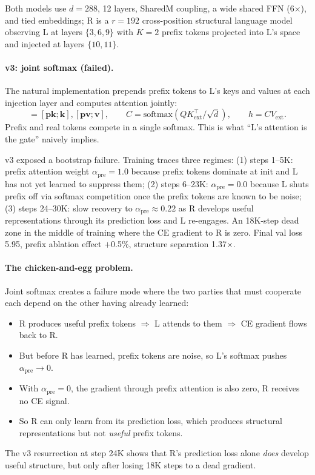 \documentclass[11pt, a4paper]{article}
\theoremstyle{plain}
\theoremstyle{definition}
\theoremstyle{remark}
\begin{document}
Both models use $d{=}288$, 12 layers, SharedM coupling, a wide shared FFN (6$\times$), and tied embeddings; R is a $r{=}192$ cross-position structural language model observing L at layers $\{3,6,9\}$ with $K{=}2$ prefix tokens projected into L's space and injected at layers $\{10,11\}$.

\paragraph{v3: joint softmax (failed).}
The natural implementation prepends prefix tokens to L's keys and values at each injection layer and computes attention jointly:
\begin{equation}
[\mathbf{k}_{\text{ext}}; \mathbf{v}_{\text{ext}}] = [\mathbf{pk}; \mathbf{k}], [\mathbf{pv}; \mathbf{v}],\qquad C = \mathrm{softmax}(QK_{\text{ext}}^\top/\sqrt{d}),\qquad h = C V_{\text{ext}}.
\end{equation}
Prefix and real tokens compete in a single softmax.
This is what ``L's attention is the gate'' naively implies.

v3 exposed a bootstrap failure.
Training traces three regimes: (1) steps 1--5K: prefix attention weight $\alpha_{\text{pre}}=1.0$ because prefix tokens dominate at init and L has not yet learned to suppress them; (2) steps 6--23K: $\alpha_{\text{pre}}=0.0$ because L shuts prefix off via softmax competition once the prefix tokens are known to be noise; (3) steps 24--30K: slow recovery to $\alpha_{\text{pre}}\approx 0.22$ as R develops useful representations through its prediction loss and L re-engages.
An 18K-step dead zone in the middle of training where the CE gradient to R is zero.
Final val loss 5.95, prefix ablation effect $+$0.5\%, structure separation 1.37$\times$.

\paragraph{The chicken-and-egg problem.}
Joint softmax creates a failure mode where the two parties that must cooperate each depend on the other having already learned:
\begin{itemize}[nosep]
\item R produces useful prefix tokens $\Longrightarrow$ L attends to them $\Longrightarrow$ CE gradient flows back to R.
\item But before R has learned, prefix tokens are noise, so L's softmax pushes $\alpha_{\text{pre}}{\to}0$.
\item With $\alpha_{\text{pre}}{=}0$, the gradient through prefix attention is also zero, R receives no CE signal.
\item So R can only learn from its prediction loss, which produces structural representations but not \emph{useful} prefix tokens.
\end{itemize}
The v3 resurrection at step 24K shows that R's prediction loss alone \emph{does} develop useful structure, but only after losing 18K steps to a dead gradient.
\end{document}
